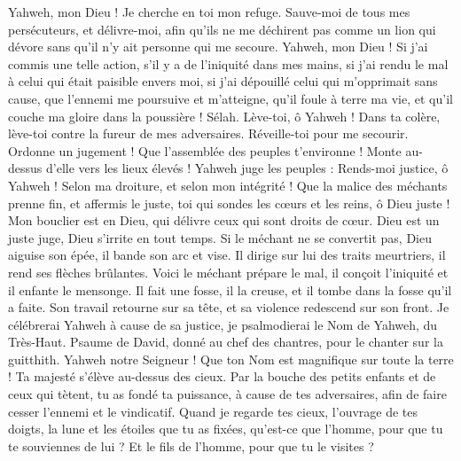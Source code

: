 \begin{multicols}{2}
Yahweh, mon Dieu ! Je cherche en toi mon refuge. Sauve-moi de tous mes persécuteurs, et délivre-moi,
afin qu'ils ne me déchirent pas comme un lion qui dévore sans qu'il n'y ait personne qui me secoure.
Yahweh, mon Dieu ! Si j'ai commis une telle action, s'il y a de l'iniquité dans mes mains,
si j'ai rendu le mal à celui qui était paisible envers moi, si j'ai dépouillé celui qui m'opprimait sans cause,
que l'ennemi me poursuive et m'atteigne, qu'il foule à terre ma vie, et qu'il couche ma gloire dans la poussière ! Sélah.
Lève-toi, ô Yahweh ! Dans ta colère, lève-toi contre la fureur de mes adversaires. Réveille-toi pour me secourir. Ordonne un jugement !
Que l'assemblée des peuples t'environne ! Monte au-dessus d'elle vers les lieux élevés !
Yahweh juge les peuples : Rends-moi justice, ô Yahweh ! Selon ma droiture, et selon mon intégrité !
Que la malice des méchants prenne fin, et affermis le juste, toi qui sondes les cœurs et les reins, ô Dieu juste !
Mon bouclier est en Dieu, qui délivre ceux qui sont droits de cœur.
Dieu est un juste juge, Dieu s'irrite en tout temps.
Si le méchant ne se convertit pas, Dieu aiguise son épée, il bande son arc et vise.
Il dirige sur lui des traits meurtriers, il rend ses flèches brûlantes.
Voici le méchant prépare le mal, il conçoit l'iniquité et il enfante le mensonge.
Il fait une fosse, il la creuse, et il tombe dans la fosse qu'il a faite.
Son travail retourne sur sa tête, et sa violence redescend sur son front.
Je célébrerai Yahweh à cause de sa justice, je psalmodierai le Nom de Yahweh, du Très-Haut.
\VerseOne{}Psaume de David, donné au chef des chantres, pour le chanter sur la guitthith.
Yahweh notre Seigneur ! Que ton Nom est magnifique sur toute la terre ! Ta majesté s'élève au-dessus des cieux.
Par la bouche des petits enfants et de ceux qui tètent, tu as fondé ta puissance, à cause de tes adversaires, afin de faire cesser l'ennemi et le vindicatif.
Quand je regarde tes cieux, l'ouvrage de tes doigts, la lune et les étoiles que tu as fixées,
qu'est-ce que l'homme, pour que tu te souviennes de lui ? Et le fils de l'homme, pour que tu le visites ?

\end{multicols}
